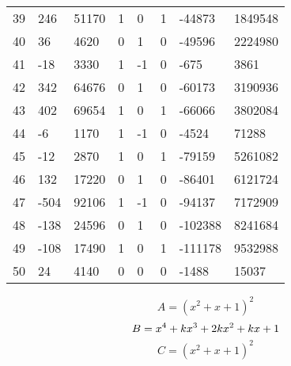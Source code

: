 \documentclass{amsart}
\begin{document}
\begin{longtable}{|l|l|l|lllll|}
39&246&51170&1&0&1&-44873&1849548\\
40&36&4620&0&1&0&-49596&2224980\\
41&-18&3330&1&-1&0&-675&3861\\
42&342&64676&0&1&0&-60173&3190936\\
43&402&69654&1&0&1&-66066&3802084\\
44&-6&1170&1&-1&0&-4524&71288\\
45&-12&2870&1&0&1&-79159&5261082\\
46&132&17220&0&1&0&-86401&6121724\\
47&-504&92106&1&-1&0&-94137&7172909\\
48&-138&24596&0&1&0&-102388&8241684\\
49&-108&17490&1&0&1&-111178&9532988\\
50&24&4140&0&0&0&-1488&15037\\
\hline
\end{longtable}
$$A=(x^2
 + x
 + 1)^{2}$$
$$B=x^4
 + k\*x^3
 + 2\*k\*x^2
 + k\*x
 + 1$$
$$C=(x^2
 + x
 + 1)^{2}$$
\end{document}
